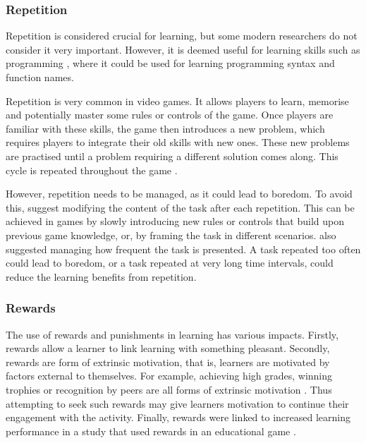 \documentclass[a4paper,11.5pt]{report}
\numberwithin{figure}{section}
\numberwithin{table}{section}
\numberwithin{equation}{section}
\numberwithin{equation}{section}
\begin{document}

\subsubsection{Repetition}

Repetition is considered crucial for learning, but some modern researchers do not consider it very important. However, it is deemed useful for learning skills such as programming \citep{roungas2015}, where it could be used for learning programming syntax and function names.

Repetition is very common in video games. It allows players to learn, memorise and potentially master some rules or controls of the game. Once players are familiar with these skills, the game then introduces a new problem, which requires players to integrate their old skills with new ones. These new problems are practised until a  problem requiring a different solution comes along. This cycle is repeated throughout the game \citep{Gee2003}.

However, repetition needs to be managed, as it could lead to boredom. To avoid this, \citet{roungas2015} suggest modifying the content of the task after each repetition. This can be achieved in games by slowly introducing new rules or controls that build upon previous game knowledge, or, by framing the task in different scenarios. \citet{roungas2015} also suggested managing how frequent the task is presented. A task repeated too often could lead to boredom, or a task repeated at very long time intervals, could reduce the learning benefits from repetition.


\subsubsection{Rewards}

The use of rewards and punishments in learning has various impacts. Firstly, rewards allow a learner to link learning with something pleasant. Secondly, rewards are form of extrinsic motivation, that is, learners are motivated by factors external to themselves. For example, achieving high grades, winning trophies or recognition by peers are all forms of extrinsic motivation \citep{roungas2015}. Thus attempting to seek such rewards may give learners motivation to continue their engagement with the activity. Finally, rewards were linked to increased learning performance in a study that used rewards in an educational game \citep{Filsecker2014}.
\end{document}
